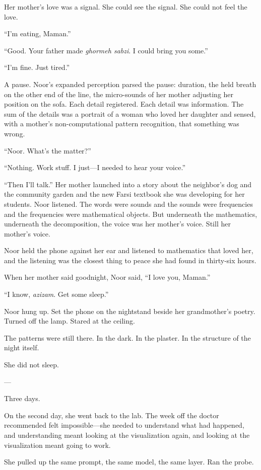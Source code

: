 Her mother's love was a signal. She could see the signal. She could not feel the love.

``I'm eating, Maman.''

``Good. Your father made \textit{ghormeh sabzi}. I could bring you some.''

``I'm fine. Just tired.''

A pause. Noor's expanded perception parsed the pause: duration, the held breath on the other end of the line, the micro-sounds of her mother adjusting her position on the sofa. Each detail registered. Each detail was information. The sum of the details was a portrait of a woman who loved her daughter and sensed, with a mother's non-computational pattern recognition, that something was wrong.

``Noor. What's the matter?''

``Nothing. Work stuff. I just---I needed to hear your voice.''

``Then I'll talk.'' Her mother launched into a story about the neighbor's dog and the community garden and the new Farsi textbook she was developing for her students. Noor listened. The words were sounds and the sounds were frequencies and the frequencies were mathematical objects. But underneath the mathematics, underneath the decomposition, the voice was her mother's voice. Still her mother's voice.

Noor held the phone against her ear and listened to mathematics that loved her, and the listening was the closest thing to peace she had found in thirty-six hours.

When her mother said goodnight, Noor said, ``I love you, Maman.''

``I know, \textit{azizam}. Get some sleep.''

Noor hung up. Set the phone on the nightstand beside her grandmother's poetry. Turned off the lamp. Stared at the ceiling.

The patterns were still there. In the dark. In the plaster. In the structure of the night itself.

She did not sleep.

---

Three days.

On the second day, she went back to the lab. The week off the doctor recommended felt impossible---she needed to understand what had happened, and understanding meant looking at the visualization again, and looking at the visualization meant going to work.

She pulled up the same prompt, the same model, the same layer. Ran the probe.


